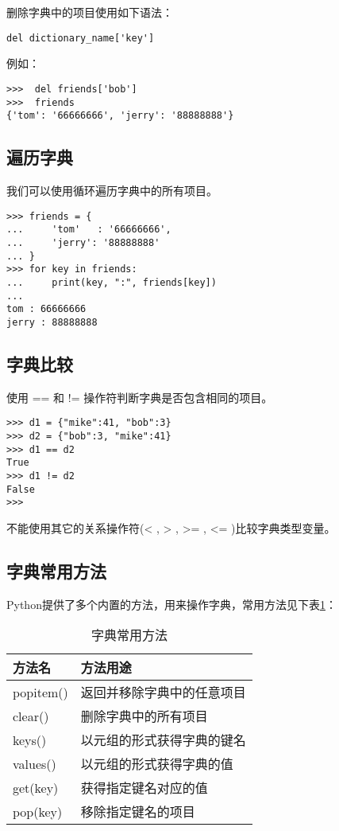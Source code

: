 删除字典中的项目使用如下语法：

\begin{lstlisting}
del dictionary_name['key']
\end{lstlisting}
例如：

\begin{lstlisting}
>>>  del friends['bob']
>>>  friends
{'tom': '66666666', 'jerry': '88888888'}
\end{lstlisting}

\subsection{遍历字典}
我们可以使用循环遍历字典中的所有项目。

\begin{lstlisting}
>>> friends = {
...     'tom'   : '66666666',
...     'jerry': '88888888'
... }
>>> for key in friends:
...     print(key, ":", friends[key])
...
tom : 66666666
jerry : 88888888
\end{lstlisting}

\subsection{字典比较}
使用 == 和 != 操作符判断字典是否包含相同的项目。

\begin{lstlisting}
>>> d1 = {"mike":41, "bob":3}
>>> d2 = {"bob":3, "mike":41}
>>> d1 == d2
True
>>> d1 != d2
False
>>>
\end{lstlisting}

\begin{myremark}{}
	不能使用其它的关系操作符(<  , > , >= , <= )比较字典类型变量。
\end{myremark}

\subsection{字典常用方法}
Python提供了多个内置的方法，用来操作字典，常用方法见下表\ref{tab:字典常用方法}：
\begin{table}[htbp]
  \centering
  \caption{字典常用方法}
    \begin{tabular}{ll}
    \toprule
    \textbf{方法名} & \textbf{方法用途} \\
    \midrule
    popitem() 			& 返回并移除字典中的任意项目 \\
    clear() 				& 删除字典中的所有项目 \\
    keys()  				& 以元组的形式获得字典的键名 \\
    values() 				& 以元组的形式获得字典的值 \\
    get(key) 				& 获得指定键名对应的值 \\
    pop(key) 				& 移除指定键名的项目 \\
    \bottomrule
    \end{tabular}%
  \label{tab:字典常用方法}%
\end{table}%

